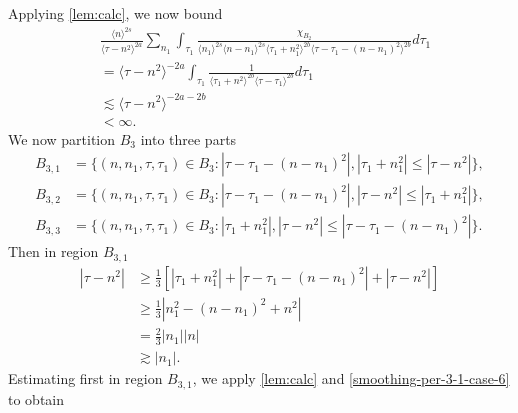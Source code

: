 \documentclass[12pt,reqno]{amsart}
\numberwithin{equation}{section}  %
\begin{document}
%
%
Applying \cref{lem:calc}, we now bound 
\begin{equation*}
  \begin{split}
    & \frac{ \langle n
    \rangle ^{2s}}{\langle \tau - n^{2} \rangle ^{2a}}
    \sum_{n_{1}} \int_{\tau_{1}} \frac{\chi_{B_{2}}}{ \langle n_{1} \rangle ^{2s} \langle n-n_{1} \rangle ^{2s} 
    \langle \tau_{1} + n_{1}^{2} \rangle^{2b} \langle  \tau - \tau_{1} -
    (n - n_{1})^{2} \rangle^{2b} }
    d \tau_1 
    \\
    & = 
   \langle \tau -n^{2} \rangle ^{-2a}\int_{\tau_{1}} \frac{1}{\langle \tau_{1} +
  n^{2} \rangle^{2b} \langle
  \tau - \tau_{1}\rangle^{2b} }d \tau_{1}
  \\
  & \lesssim 
  \langle \tau - n^{2} \rangle ^{-2a-2b} 
  \\
  & < \infty.
\end{split}
\end{equation*}
%
%
We now 
partition $ B_{3}$ into three parts
\begin{align*}
B_{3,1}&=\{(n, n_1, \tau, \tau_1)\in B_3:
|\tau-\tau_1-(n-n_1)^2|, |\tau_1+n_1^2| \le |\tau-n^2|\},\\
B_{3,2}&=\{(n, n_1, \tau, \tau_1)\in B_3:
|\tau-\tau_1-(n-n_1)^2|, |\tau-n^2| \le |\tau_1+n_1^2|\},\\
B_{3,3}&=\{(n, n_1, \tau, \tau_1)\in B_3: |\tau_{1}+n_{1}^2|, | \tau - n^{2} | \le |  \tau - \tau_{1} -
(n - n_{1})^{2} |\}.
\end{align*} 
Then in region $B_{3,1}$
\begin{equation}
\begin{split}
  | \tau - n^{2} |
  & \ge \frac{1}{3}\left[ | \tau_{1} + n_{1}^{2} | + | \tau -
  \tau_{1} - (n - n_{1})^{2}
  | + | \tau - n^{2} | \right]
  \\
  & \ge \frac{1}{3} |  n_{1}^{2} - (n - n_{1})^{2} + n^{2} |
  \\
  & = \frac{2}{3} | n_{1} | | n |
  \\
  & \gtrsim | n_{1} |.
\end{split}
\label{smoothing-per-3-1-case-6}
\end{equation}
%
%
Estimating first in region
$B_{3,1}$, we apply \cref{lem:calc} and \eqref{smoothing-per-3-1-case-6}
to obtain
%
%
%
%
\end{document}
